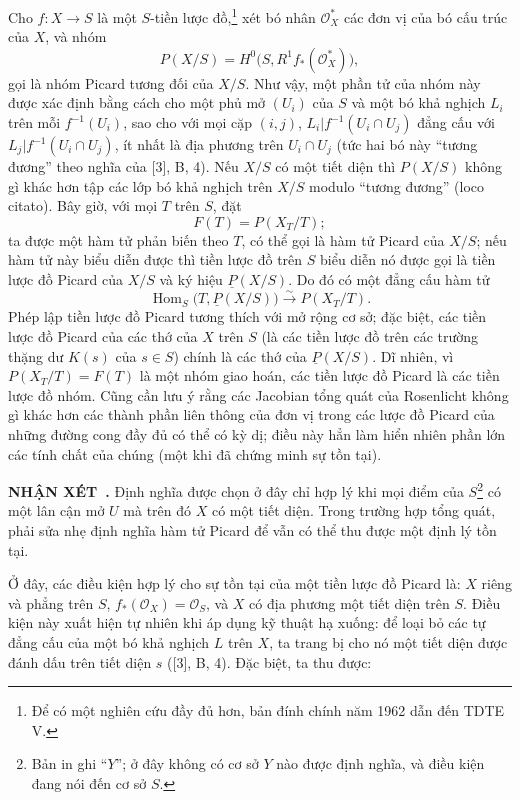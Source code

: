 \documentclass[11pt,twoside,openany]{book}
\numberwithin{equation}{section}
\newcommand{\result}[2]{\par\medskip\noindent\textbf{#1\if\relax\detokenize{#2}\relax\else\ #2\fi.}\quad}
\begin{document}
Cho $f:X\longrightarrow S$ là một $S$-tiền lược đồ,\footnote{Để có một nghiên
cứu đầy đủ hơn, bản đính chính năm 1962 dẫn đến TDTE V.} xét bó nhân
$\mathcal O_X^*$ các đơn vị của bó cấu trúc của $X$, và nhóm
\[
  P(X/S)=H^0\bigl(S,R^1f_*(\mathcal O_X^*)\bigr),
\]
gọi là nhóm Picard tương đối của $X/S$. Như vậy, một phần tử của nhóm này được
xác định bằng cách cho một phủ mở $(U_i)$ của $S$ và một bó khả nghịch $L_i$
trên mỗi $f^{-1}(U_i)$, sao cho với mọi cặp $(i,j)$,
$L_i|f^{-1}(U_i\cap U_j)$ đẳng cấu với
$L_j|f^{-1}(U_i\cap U_j)$, ít nhất là địa phương trên $U_i\cap U_j$ (tức hai bó
này ``tương đương'' theo nghĩa của [3], B, 4). Nếu $X/S$ có một tiết diện thì
$P(X/S)$ không gì khác hơn tập các lớp bó khả nghịch trên $X/S$ modulo
``tương đương'' (loco citato). Bây giờ, với mọi $T$ trên $S$, đặt
\[
  F(T)=P(X_T/T) ;
\]
ta được một hàm tử phản biến theo $T$, có thể gọi là hàm tử Picard của $X/S$;
nếu hàm tử này biểu diễn được thì tiền lược đồ trên $S$ biểu diễn nó được gọi
là tiền lược đồ Picard của $X/S$ và ký hiệu $\underline P(X/S)$. Do đó có một
đẳng cấu hàm tử
\[
  \operatorname{Hom}_S\bigl(T,\underline P(X/S)\bigr)
  \xrightarrow{\sim}P(X_T/T).
\]
Phép lập tiền lược đồ Picard tương thích với mở rộng cơ sở; đặc biệt, các tiền
lược đồ Picard của các thớ của $X$ trên $S$ (là các tiền lược đồ trên các
trường thặng dư $K(s)$ của $s\in S$) chính là các thớ của
$\underline P(X/S)$. Dĩ nhiên, vì $P(X_T/T)=F(T)$ là một nhóm giao hoán, các
tiền lược đồ Picard là các tiền lược đồ nhóm. Cũng cần lưu ý rằng các Jacobian
tổng quát của Rosenlicht không gì khác hơn các thành phần liên thông của đơn
vị trong các lược đồ Picard của những đường cong đầy đủ có thể có kỳ dị; điều
này hẳn làm hiển nhiên phần lớn các tính chất của chúng (một khi đã chứng minh
sự tồn tại).

\result{NHẬN XÉT}{} Định nghĩa được chọn ở đây chỉ hợp lý khi mọi điểm của
$S$\footnote{Bản in ghi ``$Y$''; ở đây không có cơ sở $Y$ nào được định nghĩa,
và điều kiện đang nói đến cơ sở $S$.} có một lân cận mở $U$ mà trên đó $X$ có
một tiết diện. Trong trường hợp tổng quát, phải sửa nhẹ định nghĩa hàm tử
Picard để vẫn có thể thu được một định lý tồn tại.

Ở đây, các điều kiện hợp lý cho sự tồn tại của một tiền lược đồ Picard là:
$X$ riêng và phẳng trên $S$, $f_*(\mathcal O_X)=\mathcal O_S$, và $X$ có địa
phương một tiết diện trên $S$. Điều kiện này xuất hiện tự nhiên khi áp dụng kỹ
thuật hạ xuống: để loại bỏ các tự đẳng cấu của một bó khả nghịch $L$ trên $X$,
ta trang bị cho nó một tiết diện được đánh dấu trên tiết diện $s$ ([3], B, 4).
Đặc biệt, ta thu được:
\end{document}
